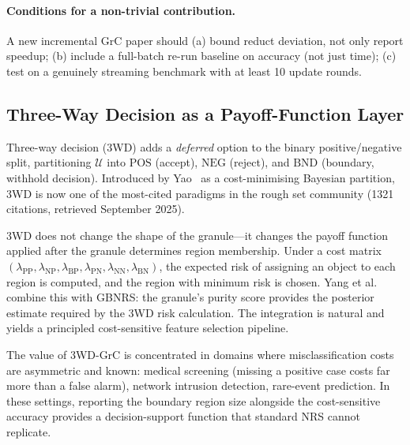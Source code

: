 \paragraph{Conditions for a non-trivial contribution.}
A new incremental GrC paper should (a) bound reduct deviation, not only report
speedup; (b) include a full-batch re-run baseline on accuracy (not just time);
(c) test on a genuinely streaming benchmark with at least 10 update rounds.

\subsection{Three-Way Decision as a Payoff-Function Layer}
\label{sec:trend_3wd}

Three-way decision (3WD) adds a \emph{deferred} option to the binary
positive/negative split, partitioning $\mathcal{U}$ into $\mathrm{POS}$
(accept), $\mathrm{NEG}$ (reject), and $\mathrm{BND}$ (boundary, withhold
decision).  Introduced by Yao~\cite{Yao2010threeway} as a cost-minimising Bayesian
partition, 3WD is now one of the most-cited paradigms in the rough set
community (1321 citations, retrieved September 2025).

3WD does not change the shape of the granule---it changes the payoff function
applied after the granule determines region membership.  Under a cost
matrix $(\lambda_{\mathrm{PP}}, \lambda_{\mathrm{NP}}, \lambda_{\mathrm{BP}},
\lambda_{\mathrm{PN}}, \lambda_{\mathrm{NN}}, \lambda_{\mathrm{BN}})$,
the expected risk of assigning an object to each region is computed, and the
region with minimum risk is chosen.  Yang et al.~\cite{Xia2024TFS3WC} combine
this with GBNRS: the granule's purity score provides the posterior estimate
required by the 3WD risk calculation.  The integration is natural and yields
a principled cost-sensitive feature selection pipeline.

The value of 3WD-GrC is concentrated in domains where misclassification costs are
asymmetric and known: medical screening (missing a positive case costs far
more than a false alarm), network intrusion detection, rare-event prediction.
In these settings, reporting the boundary region size alongside the cost-sensitive
accuracy provides a decision-support function that standard NRS cannot replicate.

